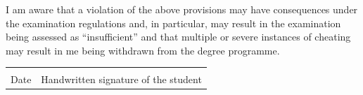 I am aware that a violation of the above provisions may have consequences under
the examination regulations and, in particular, may result in the examination
being assessed as ``insufficient'' and that multiple or severe instances of
cheating may result in me being withdrawn from the degree programme.

\vspace{2cm}

\noindent
\begin{tabular}{p{6cm} p{8cm}}
  \hrulefill & \hrulefill \\
  Date & Handwritten signature of the student
\end{tabular}
